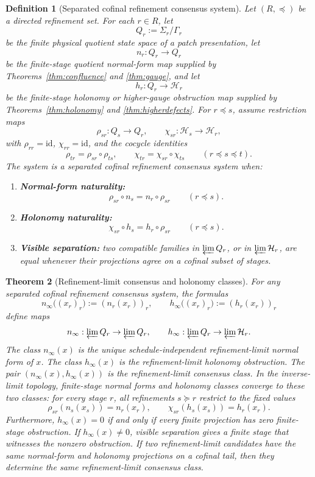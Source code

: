 \documentclass[11pt]{article}
\newtheorem{theorem}{Theorem}[section]
\newtheorem{definition}[theorem]{Definition}
\theoremstyle{remark}
\theoremstyle{plain}
\begin{document}
\begin{definition}[Separated cofinal refinement consensus system]\label{def:refinement-consensus}
Let \((R,\preceq)\) be a directed refinement set. For each \(r\in R\), let
\[
Q_r:=\Sigma_r/\Gamma_r
\]
be the finite physical quotient state space of a patch presentation, let
\[
n_r:Q_r\to Q_r
\]
be the finite-stage quotient normal-form map supplied by Theorems~\ref{thm:confluence} and
\ref{thm:gauge}, and let
\[
h_r:Q_r\to \mathcal H_r
\]
be the finite-stage holonomy or higher-gauge obstruction map supplied by
Theorems~\ref{thm:holonomy} and \ref{thm:higherdefects}. For \(r\preceq s\), assume restriction
maps
\[
\rho_{sr}:Q_s\to Q_r,
\qquad
\chi_{sr}:\mathcal H_s\to\mathcal H_r,
\]
with \(\rho_{rr}=\mathrm{id}\), \(\chi_{rr}=\mathrm{id}\), and the cocycle identities
\[
\rho_{tr}=\rho_{sr}\circ\rho_{ts},
\qquad
\chi_{tr}=\chi_{sr}\circ\chi_{ts}
\qquad
(r\preceq s\preceq t).
\]
The system is a separated cofinal refinement consensus system when:
\begin{enumerate}
\item \textbf{Normal-form naturality:}
\[
\rho_{sr}\circ n_s=n_r\circ\rho_{sr}
\qquad
(r\preceq s).
\]
\item \textbf{Holonomy naturality:}
\[
\chi_{sr}\circ h_s=h_r\circ\rho_{sr}
\qquad
(r\preceq s).
\]
\item \textbf{Visible separation:} two compatible families in \(\varprojlim Q_r\), or in
\(\varprojlim \mathcal H_r\), are equal whenever their projections agree on a cofinal subset of
stages.
\end{enumerate}
\end{definition}

\begin{theorem}[Refinement-limit consensus and holonomy classes]\label{thm:refinement-consensus}
For any separated cofinal refinement consensus system, the formulas
\[
n_\infty\bigl((x_r)_r\bigr):=(n_r(x_r))_r,
\qquad
h_\infty\bigl((x_r)_r\bigr):=(h_r(x_r))_r
\]
define maps
\[
n_\infty:\varprojlim Q_r\to\varprojlim Q_r,
\qquad
h_\infty:\varprojlim Q_r\to\varprojlim\mathcal H_r.
\]
The class \(n_\infty(x)\) is the unique schedule-independent refinement-limit normal form of
\(x\). The class \(h_\infty(x)\) is the refinement-limit holonomy obstruction. The pair
\((n_\infty(x),h_\infty(x))\) is the refinement-limit consensus class. In the inverse-limit
topology, finite-stage normal forms and holonomy classes converge to these two classes: for every
stage \(r\), all refinements \(s\succeq r\) restrict to the fixed values
\[
\rho_{sr}(n_s(x_s))=n_r(x_r),
\qquad
\chi_{sr}(h_s(x_s))=h_r(x_r).
\]
Furthermore, \(h_\infty(x)=0\) if and only if every finite projection has zero finite-stage
obstruction. If \(h_\infty(x)\ne0\), visible separation gives a finite stage that witnesses the
nonzero obstruction. If two refinement-limit candidates have the same normal-form and holonomy
projections on a cofinal tail, then they determine the same refinement-limit consensus class.
\end{theorem}
\end{document}

